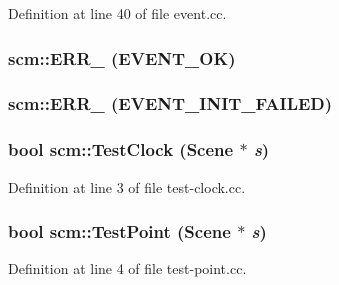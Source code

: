 Definition at line 40 of file event.cc.

\hypertarget{namespacescm_af343ae95ed75977e4da042874b9edacc}{
\subsubsection[{ERR\_\-}]{\setlength{\rightskip}{0pt plus 5cm}scm::ERR\_\- (EVENT\_\-OK)}}
\label{namespacescm_af343ae95ed75977e4da042874b9edacc}
\hypertarget{namespacescm_adbb7998a18f4d5b55f2d9af9146e27e9}{
\subsubsection[{ERR\_\-}]{\setlength{\rightskip}{0pt plus 5cm}scm::ERR\_\- (EVENT\_\-INIT\_\-FAILED)}}
\label{namespacescm_adbb7998a18f4d5b55f2d9af9146e27e9}
\hypertarget{namespacescm_a2f933647227de09b34772f194e579a63}{
\subsubsection[{TestClock}]{\setlength{\rightskip}{0pt plus 5cm}bool scm::TestClock (Scene $\ast$ {\em s})}}
\label{namespacescm_a2f933647227de09b34772f194e579a63}


Definition at line 3 of file test-\/clock.cc.

\hypertarget{namespacescm_aca67b9b84fd6253da0c69b4c521e6bc6}{
\subsubsection[{TestPoint}]{\setlength{\rightskip}{0pt plus 5cm}bool scm::TestPoint (Scene $\ast$ {\em s})}}
\label{namespacescm_aca67b9b84fd6253da0c69b4c521e6bc6}


Definition at line 4 of file test-\/point.cc.


